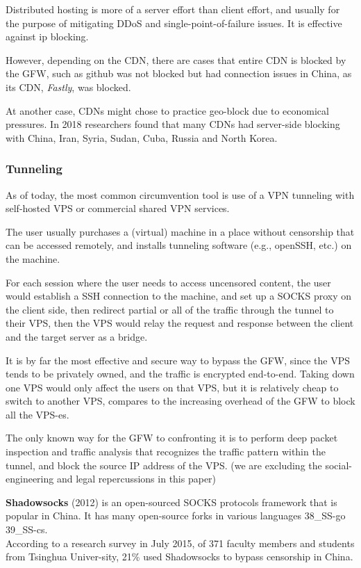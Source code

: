 Distributed hosting is more of a server effort than client effort, and
usually for the purpose of mitigating DDoS and single-point-of-failure
issues. It is effective against ip blocking.

However, depending on the CDN, there are cases that entire CDN is
blocked by the GFW, such as github was not blocked but had connection
issues in China, as its CDN, \emph{Fastly}, was blocked.
\cite{19_detect}

At another case, CDNs might chose to practice geo-block due to
economical pressures. In 2018 researchers found that many CDNs had
server-side blocking with China, Iran, Syria, Sudan, Cuba, Russia and
North Korea. \cite{51_CDN403}

\hypertarget{tunneling}{%
\subsubsection{Tunneling}\label{tunneling}}

As of today, the most common circumvention tool is use of a VPN
tunneling with self-hosted VPS or commercial shared VPN services.

The user usually purchases a (virtual) machine in a place without
censorship that can be accessed remotely, and installs tunneling
software (e.g., openSSH, etc.) on the machine.

For each session where the user needs to access uncensored content, the
user would establish a SSH connection to the machine, and set up a SOCKS
proxy on the client side, then redirect partial or all of the traffic
through the tunnel to their VPS, then the VPS would relay the request
and response between the client and the target server as a bridge.

It is by far the most effective and secure way to bypass the GFW, since
the VPS tends to be privately owned, and the traffic is encrypted
end-to-end. Taking down one VPS would only affect the users on that VPS,
but it is relatively cheap to switch to another VPS, compares to the
increasing overhead of the GFW to block all the VPS-es.

The only known way for the GFW to confronting it is to perform deep
packet inspection and traffic analysis that recognizes the traffic
pattern within the tunnel, and block the source IP address of the VPS.
(we are excluding the social-engineering and legal repercussions in this
paper)

\textbf{Shadowsocks} (2012) is an open-sourced SOCKS protocols framework
that is popular in China. It has many open-source forks in various
languages \cite{36_SS-py} \cite{37_SS-rust} 38\_SS-go 39\_SS-cs.\\
According to a research survey in July 2015, of 371 faculty members and
students from Tsinghua Univer-sity, 21\% used Shadowsocks to bypass
censorship in China. \cite{50_googleScholar}

